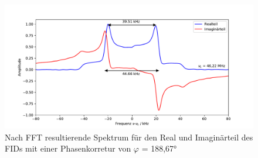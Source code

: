 \begin{figure}[H]
    \centering
    \includegraphics[width=\textwidth]{Auswertung/Spek/Spek.pdf}
    \caption{Nach FFT resultierende Spektrum für den Real und Imaginärteil des
    FIDs mit einer Phasenkorretur von $\varphi$ = 188,67° }
    \label{fig:spek}
\end{figure}
